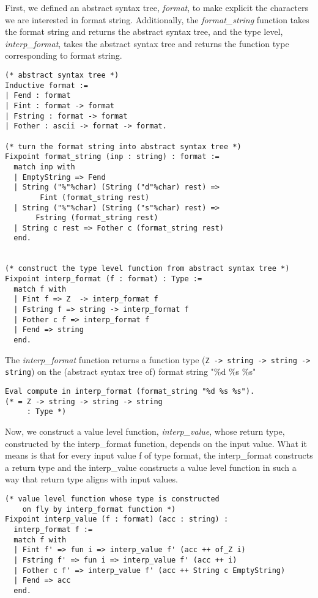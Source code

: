First, we defined an abstract syntax tree, \textit{format}, to make explicit the characters we 
are interested in format string. Additionally, the \textit{format\_string} function takes the format string 
and returns the abstract syntax tree, and the type level, \textit{interp\_format}, takes the 
abstract syntax tree and returns the function type corresponding to format string.

\begin{verbatim}
(* abstract syntax tree *)
Inductive format :=
| Fend : format
| Fint : format -> format
| Fstring : format -> format
| Fother : ascii -> format -> format.

(* turn the format string into abstract syntax tree *)
Fixpoint format_string (inp : string) : format :=
  match inp with
  | EmptyString => Fend
  | String ("%"%char) (String ("d"%char) rest) => 
        Fint (format_string rest)
  | String ("%"%char) (String ("s"%char) rest) => 
       Fstring (format_string rest)
  | String c rest => Fother c (format_string rest)
  end.


(* construct the type level function from abstract syntax tree *)
Fixpoint interp_format (f : format) : Type :=
  match f with
  | Fint f => Z  -> interp_format f
  | Fstring f => string -> interp_format f
  | Fother c f => interp_format f
  | Fend => string
  end.
\end{verbatim}


\noindent
The \textit{interp\_format} function returns a function type 
(\texttt{Z -> string -> string -> string})  on the (abstract syntax tree of) 
format string "\%d \%s \%s" 

\begin{verbatim}
Eval compute in interp_format (format_string "%d %s %s").
(* = Z -> string -> string -> string
     : Type *)
\end{verbatim}

Now, we construct a value level function, \textit{interp\_value}, whose return 
type, constructed by the interp\_format function, depends on the input value. 
What it means is that for every input value f of type format,  the 
interp\_format  constructs a return type and 
the  interp\_value constructs a value level function in 
such a way that return type aligns with input values.   

\begin{verbatim}
(* value level function whose type is constructed 
    on fly by interp_format function *)
Fixpoint interp_value (f : format) (acc : string) : 
  interp_format f :=
  match f with
  | Fint f' => fun i => interp_value f' (acc ++ of_Z i)
  | Fstring f' => fun i => interp_value f' (acc ++ i)
  | Fother c f' => interp_value f' (acc ++ String c EmptyString)
  | Fend => acc
  end.
\end{verbatim}

